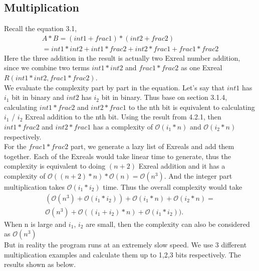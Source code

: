 \documentclass[12pt,twoside,notitlepage]{report}
\begin{document}
\subsection {Multiplication}
Recall the equation 3.1,
\begin{equation}
\begin{split}
A*B=(int1+frac1)*(int2+frac2)\\
=int1*int2+int1*frac2+int2*frac1+frac1*frac2
\end{split}
\end{equation}
Here the three addition in the result is actually two Exreal number addition, since we combine two terms $int1*int2$ and $frac1*frac2$ as one Exreal $R(int1*int2, frac1*frac2)$. \\
We evaluate the complexity part by part in the equation. Let's say that $int1$ has $i_{1}$ bit in binary and $int2$ has $i_{2}$ bit in binary. Thus base on section 3.1.4, calculating $int1*frac2$ and $int2*frac1$ to the nth bit is equivalent to calculating $i_{1}$ / $i_{2}$ Exreal addition to the nth bit. Using the result from 4.2.1, then $int1*frac2$ and $int2*frac1$ has a complexity of $\mathcal{O}(i_{1}*n)$ and $\mathcal{O}(i_{2}*n)$ respectively.\\  
For the $frac1*frac2$ part, we generate a lazy list of Exreals and add them together. Each of the Exreals would take linear time to generate,  thus the complexity is equivalent to doing $(n+2)$ Exreal addition and it has a complexity of $\mathcal{O}((n+2)*n) * \mathcal{O}(n)= \mathcal{O}(n^{3})$. And the integer part multiplication takes $\mathcal{O}(i_{1}*i_{2})$ time. Thus the overall complexity would take
\begin{equation}
\begin{split}
(\mathcal{O}(n^{3}) + \mathcal{O}(i_{1}*i_{2})) + \mathcal{O}(i_{1}*n) + \mathcal{O}(i_{2}*n) =\\ 
\mathcal{O}(n^3) + \mathcal{O}((i_{1}+i_{2}) * n) + \mathcal{O}(i_{1}*i_{2})).  
\end{split}
\end{equation}
When n is large and $i_1$, $i_2$ are small, then the complexity can also be considered as $\mathcal{O}(n^3)$\\
But in reality the program runs at an extremely slow speed. We use 3 different multiplication examples and calculate them up to 1,2,3 bits respectively. The results shown as below.
\end{document}

